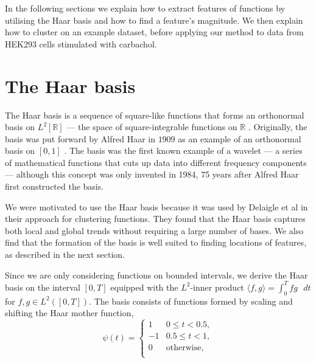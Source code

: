 \documentclass[12pt]{book} %
\begin{document}
 In the following sections we explain how to extract features of functions by utilising the Haar basis and how to find a feature's magnitude. We then explain how to cluster on an example dataset, before applying our method to data from HEK293 cells stimulated with carbachol. 

\section{The Haar basis}
The Haar basis is a sequence of square-like functions that forms an orthonormal basis on $L^2[\mathbb{R}]$ --- the space of square-integrable functions on $\mathbb{R}$ . Originally, the basis was put forward by Alfred Haar in $1909$ as an example of an orthonormal basis on $[0,1]$ \cite{}. The basis was the first known example of a wavelet --- a series of mathematical functions that cuts up data into different frequency components --- although this concept was only invented in 1984, 75 years after Alfred Haar first constructed the basis. \cite{}  
 
We were motivated to use the Haar basis because it was used by Delaigle et al \cite{} in their approach for clustering functions. They found that the Haar basis captures both local and global trends without requiring a large number of bases. We also find that the formation of the basis is well suited to finding locations of features, as described in the next section. 


 Since we are only considering functions on bounded intervals, we derive the Haar basis on the interval $[0,T]$ equipped with the $L^2$-inner product $\langle f,g \rangle = \int^T_0 fg \text{ }  dt$ for $f,g \in L^2\left( \left[0,T \right] \right)$. The basis consists of functions formed by scaling and shifting the Haar mother function, 
\begin{equation*}
\psi(t) =
\begin{cases}
	1 & 0 \leq t < 0.5,\\
	-1 & 0.5 \leq t <1,\\
	0 & \text{otherwise,}\\
\end{cases} 	
\end{equation*}
\end{document}
